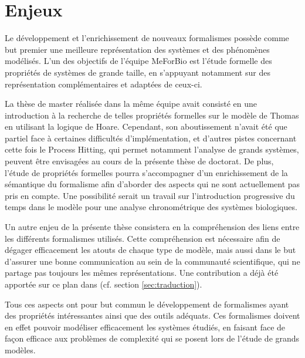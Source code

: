 \section{Enjeux}


Le développement et l'enrichissement de nouveaux formalismes possède comme but premier une meilleure représentation des systèmes et des phénomènes modélisés.
L'un des objectifs de l'équipe MeForBio est l'étude formelle des propriétés de systèmes de grande taille,
en s'appuyant notamment sur des représentation complémentaires et adaptées de ceux-ci.

La thèse de master \cite{Folschette2011} réalisée dans la même équipe avait consisté en une introduction à la recherche de telles propriétés formelles sur le modèle de Thomas en utilisant la logique de Hoare.
Cependant, son aboutissement n'avait été que partiel face à certaines difficultés d'implémentation,
et d'autres pistes concernant cette fois le Process Hitting, qui permet notamment l'analyse de grands systèmes, peuvent être envisagées au cours de la présente thèse de doctorat.
De plus, l'étude de propriétés formelles pourra s'accompagner d'un enrichissement de la sémantique du formalisme afin d'aborder des aspects qui ne sont actuellement pas pris en compte.
Une possibilité serait un travail sur l'introduction progressive du temps dans le modèle pour une analyse chronométrique des systèmes biologiques.


Un autre enjeu de la présente thèse consistera en la compréhension des liens entre les différents formalismes utilisés.
Cette compréhension est nécessaire afin de dégager efficacement les atouts de chaque type de modèle,
mais aussi dans le but d'assurer une bonne communication au sein de la communauté scientifique, qui ne partage pas toujours les mêmes représentations.
Une contribution a déjà été apportée sur ce plan dans \cite{FPIMR12-CMSB} (cf. section \ref{sec:traduction}).

Tous ces aspects ont pour but commun le développement de formalismes ayant des propriétés intéressantes ainsi que des outils adéquats.
Ces formalismes doivent en effet pouvoir modéliser efficacement les systèmes étudiés,
en faisant face de façon efficace aux problèmes de complexité qui se posent lors de l'étude de grands modèles.
